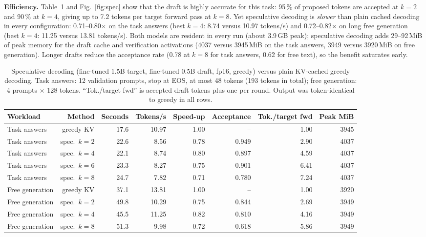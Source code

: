 \textbf{Efficiency.} Table~\ref{tab:spec} and Fig.~\ref{fig:spec} show that the draft is highly accurate for this task: 95\,\% of proposed tokens are accepted at $k=2$ and 90\,\% at $k=4$, giving up to 7.2 tokens per target forward pass at $k=8$. Yet speculative decoding is \emph{slower} than plain cached decoding in every configuration: 0.71--0.80$\times$ on the task answers (best $k=4$: 8.74 versus 10.97 tokens/s) and 0.72--0.82$\times$ on long free generation (best $k=4$: 11.25 versus 13.81 tokens/s). Both models are resident in every run (about 3.9\,GB peak); speculative decoding adds 29--92\,MiB of peak memory for the draft cache and verification activations (4037 versus 3945\,MiB on the task answers, 3949 versus 3920\,MiB on free generation). Longer drafts reduce the acceptance rate (0.78 at $k=8$ for task answers, 0.62 for free text), so the benefit saturates early.

\begin{table}[t]
\caption{Speculative decoding (fine-tuned 1.5B target, fine-tuned 0.5B draft, fp16, greedy) versus plain KV-cached greedy decoding. Task answers: 12 validation prompts, stop at EOS, at most 48 tokens (193 tokens in total); free generation: 4 prompts $\times$ 128 tokens. ``Tok./target fwd'' is accepted draft tokens plus one per round. Output was token-identical to greedy in all rows.}
\label{tab:spec}
\centering\footnotesize
\begin{tabular}{lrrrrrrr}
\hline
Workload & Method & Seconds & Tokens/s & Speed-up & Acceptance & Tok./target fwd & Peak MiB \\
\hline
Task answers & greedy KV & 17.6 & 10.97 & 1.00 & -- & 1.00 & 3945 \\
Task answers & spec.\ $k=2$ & 22.6 & 8.56 & 0.78 & 0.949 & 2.90 & 4037 \\
Task answers & spec.\ $k=4$ & 22.1 & 8.74 & 0.80 & 0.897 & 4.59 & 4037 \\
Task answers & spec.\ $k=6$ & 23.3 & 8.27 & 0.75 & 0.901 & 6.41 & 4037 \\
Task answers & spec.\ $k=8$ & 24.7 & 7.82 & 0.71 & 0.780 & 7.24 & 4037 \\
Free generation & greedy KV & 37.1 & 13.81 & 1.00 & -- & 1.00 & 3920 \\
Free generation & spec.\ $k=2$ & 49.8 & 10.29 & 0.75 & 0.844 & 2.69 & 3949 \\
Free generation & spec.\ $k=4$ & 45.5 & 11.25 & 0.82 & 0.810 & 4.16 & 3949 \\
Free generation & spec.\ $k=8$ & 51.3 & 9.98 & 0.72 & 0.618 & 5.86 & 3949 \\
\hline
\end{tabular}
\end{table}

